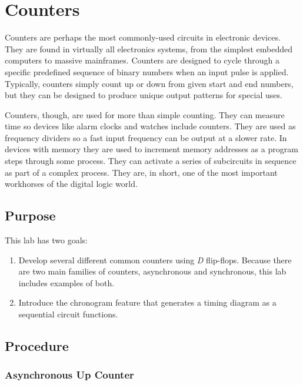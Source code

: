 \chapter{Counters}\label{count}

Counters are perhaps the most commonly-used circuits in electronic devices. They are found in virtually all electronics systems, from the simplest embedded computers to massive mainframes. Counters are designed to cycle through a specific predefined sequence of binary numbers when an input pulse is applied. Typically, counters simply count up or down from given start and end numbers, but they can be designed to produce unique output patterns for special uses. 

Counters, though, are used for more than simple counting. They can measure time so devices like alarm clocks and watches include counters. They are used as frequency dividers so a fast input frequency can be output at a slower rate. In devices with memory they are used to increment memory addresses as a program steps through some process. They can activate a series of subcircuits in sequence as part of a complex process. They are, in short, one of the most important workhorses of the digital logic world.

\section{Purpose}

This lab has two goals: 

\begin{enumerate}
	\item Develop several different common counters using \textit{D} flip-flops. Because there are two main families of counters, asynchronous and synchronous, this lab includes examples of both. 
	\item Introduce the \LE chronogram feature that generates a timing diagram as a sequential circuit functions. 
\end{enumerate}

\section{Procedure}

\subsection{Asynchronous Up Counter}

